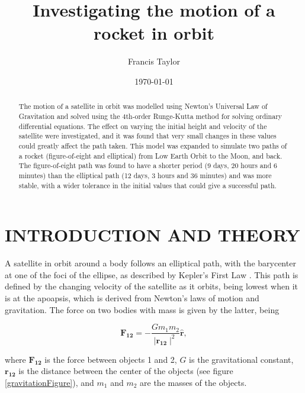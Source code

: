 \documentclass[twocolumn,prl,nobalancelastpage,aps,10pt]{revtex4-1}
\begin{document}
\title{Investigating the motion of a rocket in orbit}

\author{Francis Taylor}


\date{\today}

\begin{abstract}
The motion of a satellite in orbit was modelled using Newton's Universal Law of Gravitation and solved using the 4th-order Runge-Kutta method for solving ordinary differential equations. The effect on varying the initial height and velocity of the satellite were investigated, and it was found that very small changes in these values could greatly affect the path taken. This model was expanded to simulate two paths of a rocket (figure-of-eight and elliptical) from Low Earth Orbit to the Moon, and back. The figure-of-eight path was found to have a shorter period (9 days, 20 hours and 6 minutes) than the elliptical path (12 days, 3 hours and 36 minutes) and was more stable, with a wider tolerance in the initial values that could give a successful path.
\end{abstract}


\maketitle

\section{INTRODUCTION AND THEORY}

A satellite in orbit around a body follows an elliptical path, with the barycenter at one of the foci of the ellipse, as described by Kepler's First Law \cite{Kepler1992}. This path is defined by the changing velocity of the satellite as it orbits, being lowest when it is at the apoapsis,  which is derived from Newton's laws of motion and gravitation. The force on two bodies with mass is given by the latter, being \cite{Newton1848}

\begin{equation}\label{universalGravitation}
	\bm{F_{12}} = - \frac{G m_{1}m_{2}}{\mid\bm{r_{12}}\mid^{2}}\bm{\hat{r}} ,
\end{equation}

where $\bm{F_{12}}$ is the force between objects 1 and 2, $G$ is the gravitational constant, $\bm{r_{12}}$ is the distance between the center of the objects (see figure \ref{gravitationFigure}), and $m_{1}$ and $m_{2}$ are the masses of the objects.
\end{document}
